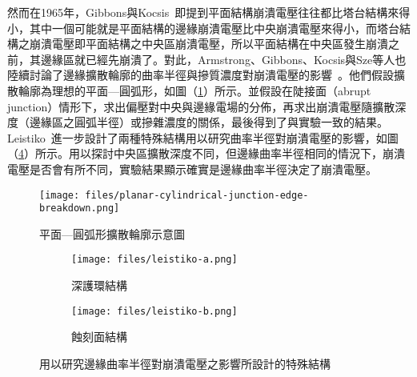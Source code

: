 然而在1965年，Gibbons與Kocsis~\cite{gibbons1965breakdown}即提到平面結構崩潰電壓往往都比塔台結構來得小，其中一個可能就是平面結構的邊緣崩潰電壓比中央崩潰電壓來得小，而塔台結構之崩潰電壓即平面結構之中央區崩潰電壓，所以平面結構在中央區發生崩潰之前，其邊緣區就已經先崩潰了。對此，Armstrong、Gibbons、Kocsis與Sze等人也陸續討論了邊緣擴散輪廓的曲率半徑與摻質濃度對崩潰電壓的影響~\cite{gibbons1965breakdown}\cite{armstrong1957theory}\cite{sze1966effect}。他們假設擴散輪廓為理想的平面—圓弧形，如圖（\ref{fig:planar-cylindrical-junction-edge-breakdown}）所示。並假設在陡接面（abrupt junction）情形下，求出偏壓對中央與邊緣電場的分佈，再求出崩潰電壓隨擴散深度（邊緣區之圓弧半徑）或摻雜濃度的關係，最後得到了與實驗一致的結果。Leistiko~\cite{leistiko1966breakdown}進一步設計了兩種特殊結構用以研究曲率半徑對崩潰電壓的影響，如圖（\ref{fig:leistiko-special-structures}）所示。用以探討中央區擴散深度不同，但邊緣曲率半徑相同的情況下，崩潰電壓是否會有所不同，實驗結果顯示確實是邊緣曲率半徑決定了崩潰電壓。

\begin{figure}[h]
\centering
\texttt{[image: files/planar-cylindrical-junction-edge-breakdown.png]}
\caption[平面—圓弧形擴散輪廓示意圖]{平面—圓弧形擴散輪廓示意圖~\cite{gibbons1965breakdown}}
\label{fig:planar-cylindrical-junction-edge-breakdown}
\end{figure}

\begin{figure}[h]
\centering
\begin{subfigure}[b]{.45\textwidth}
\centering
\texttt{[image: files/leistiko-a.png]}
\caption{深護環結構}
\label{fig:leistiko-guard-ring}
\end{subfigure}
\begin{subfigure}[b]{.45\textwidth}
\centering
\texttt{[image: files/leistiko-b.png]}
\caption{蝕刻面結構}
\label{fig:leistiko-etched-surface}
\end{subfigure}
\caption[用以研究邊緣曲率半徑對崩潰電壓之影響所設計的特殊結構]{用以研究邊緣曲率半徑對崩潰電壓之影響所設計的特殊結構~\cite{leistiko1966breakdown}}
\label{fig:leistiko-special-structures}
\end{figure}

